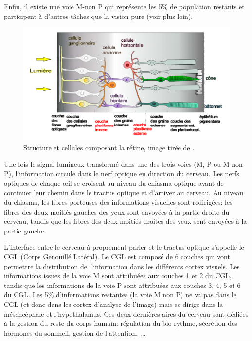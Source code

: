	\par Enfin, il existe une voie M-non P qui représente les 5\% de population restants et participent à d'autres tâches que la vision pure (voir plus loin). 
	
	\begin{figure}
		\centering
		\includegraphics[scale=.45]{Figures/StructureRetinae}
		\caption{Structure et cellules composant la rétine, image tirée de  \citep{anses_effets_2014}.}
		\label{fig:structure_retine}
	\end{figure}
	
	\par Une fois le signal lumineux transformé dans une des trois voies (M, P ou M-non P), l'information circule dans le nerf optique en direction du cerveau. Les nerfs optiques de chaque œil se croisent au niveau du chiasma optique avant de continuer leur chemin dans le tractus optique et d'arriver au cerveau. Au niveau du chiasma, les fibres porteuses des informations visuelles sont redirigées: les fibres des deux moitiés gauches des yeux sont envoyées à la partie droite du cerveau, tandis que les fibres des deux moitiés droites des yeux sont envoyées à la partie gauche.
	
	\par L'interface entre le cerveau à proprement parler et le tractus optique s'appelle le CGL (Corps Genouillé Latéral). Le CGL est composé de 6 couches qui vont permettre la distribution de l'information dans les différents cortex visuels. Les informations issues de la voie M sont attribuées aux couches 1 et 2 du CGL, tandis que les informations de la voie P sont attribuées aux couches 3, 4, 5 et 6 du CGL. Les 5\% d'informations restantes (la voie M non P) ne va pas dans le CGL (et donc dans les cortex d'analyse de l'image) mais se dirige dans la mésencéphale et l'hypothalamus. Ces deux dernières aires du cerveau sont dédiées à la gestion du reste du corps humain: régulation du bio-rythme, sécrétion des hormones du sommeil, gestion de l'attention, ...
	
